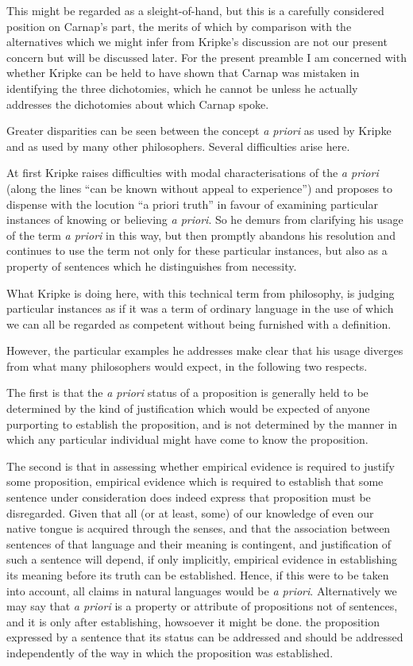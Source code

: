 This might be regarded as a sleight-of-hand, but this is a carefully
considered position on Carnap's part, the merits of which by comparison
with the alternatives which we might infer from Kripke's discussion are
not our present concern but will be discussed later.
For the present preamble I am concerned with whether Kripke can be held
to have shown that Carnap was mistaken in identifying the three dichotomies,
which he cannot be unless he actually addresses the dichotomies about
which Carnap spoke.

Greater disparities can be seen between the concept \emph{a priori} as used
by Kripke and as used by many other philosophers.
Several difficulties arise here.

At first Kripke raises difficulties with modal characterisations of the
\emph{a priori} (along the lines ``can be known without appeal to experience'')
and proposes to dispense with the locution ``a priori truth'' in favour
of examining particular instances of knowing or believing \emph{a priori}.
So he demurs from clarifying his usage of the term \emph{a priori} in this
way, but then promptly abandons his resolution and continues to use the
term not only for these particular instances, but also as a property of
sentences which he distinguishes from necessity.

What Kripke is doing here, with this technical term from philosophy,
is judging particular instances as if it was a term of ordinary language
in the use of which we can all be regarded as competent without being
furnished with a definition.

However, the particular examples he addresses make clear that his usage
diverges from what many philosophers would expect, in the following two
respects.

The first is that the \emph{a priori} status of a proposition is generally
held to be determined by the kind of justification which would be expected
of anyone purporting to establish the proposition, and is not determined
by the manner in which any particular individual might have come to know
the proposition.

The second is that in assessing whether empirical evidence is required
to justify some proposition, empirical evidence which is required to establish
that some sentence under consideration does indeed express that proposition
must be disregarded.
Given that all (or at least, some) of our knowledge of even our native tongue
is acquired through the senses, and that the association between sentences
of that language and their meaning is contingent, and justification of such
a sentence will depend, if only implicitly, empirical evidence in establishing
its meaning before its truth can be established.
Hence, if this were to be taken into account, all claims in natural languages
would be \emph{a priori}.
Alternatively we may say that \emph{a priori} is a property or attribute of
propositions not of sentences, and it is only after establishing, howsoever it might be done.
the proposition expressed by a sentence that its status can be addressed
and should be addressed independently of the way in which the proposition
was established.


